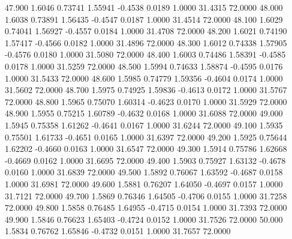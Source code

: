   47.900   1.6046   0.73741   1.55941  -0.4538   0.0189   1.0000  31.4315  72.0000
  48.000   1.6038   0.73891   1.56435  -0.4547   0.0187   1.0000  31.4514  72.0000
  48.100   1.6029   0.74041   1.56927  -0.4557   0.0184   1.0000  31.4708  72.0000
  48.200   1.6021   0.74190   1.57417  -0.4566   0.0182   1.0000  31.4896  72.0000
  48.300   1.6012   0.74338   1.57905  -0.4576   0.0180   1.0000  31.5080  72.0000
  48.400   1.6003   0.74486   1.58391  -0.4585   0.0178   1.0000  31.5259  72.0000
  48.500   1.5994   0.74633   1.58874  -0.4595   0.0176   1.0000  31.5433  72.0000
  48.600   1.5985   0.74779   1.59356  -0.4604   0.0174   1.0000  31.5602  72.0000
  48.700   1.5975   0.74925   1.59836  -0.4613   0.0172   1.0000  31.5767  72.0000
  48.800   1.5965   0.75070   1.60314  -0.4623   0.0170   1.0000  31.5929  72.0000
  48.900   1.5955   0.75215   1.60789  -0.4632   0.0168   1.0000  31.6088  72.0000
  49.000   1.5945   0.75358   1.61262  -0.4641   0.0167   1.0000  31.6244  72.0000
  49.100   1.5935   0.75501   1.61733  -0.4651   0.0165   1.0000  31.6397  72.0000
  49.200   1.5925   0.75644   1.62202  -0.4660   0.0163   1.0000  31.6547  72.0000
  49.300   1.5914   0.75786   1.62668  -0.4669   0.0162   1.0000  31.6695  72.0000
  49.400   1.5903   0.75927   1.63132  -0.4678   0.0160   1.0000  31.6839  72.0000
  49.500   1.5892   0.76067   1.63592  -0.4687   0.0158   1.0000  31.6981  72.0000
  49.600   1.5881   0.76207   1.64050  -0.4697   0.0157   1.0000  31.7121  72.0000
  49.700   1.5869   0.76346   1.64505  -0.4706   0.0155   1.0000  31.7258  72.0000
  49.800   1.5858   0.76485   1.64955  -0.4715   0.0154   1.0000  31.7393  72.0000
  49.900   1.5846   0.76623   1.65403  -0.4724   0.0152   1.0000  31.7526  72.0000
  50.000   1.5834   0.76762   1.65846  -0.4732   0.0151   1.0000  31.7657  72.0000
